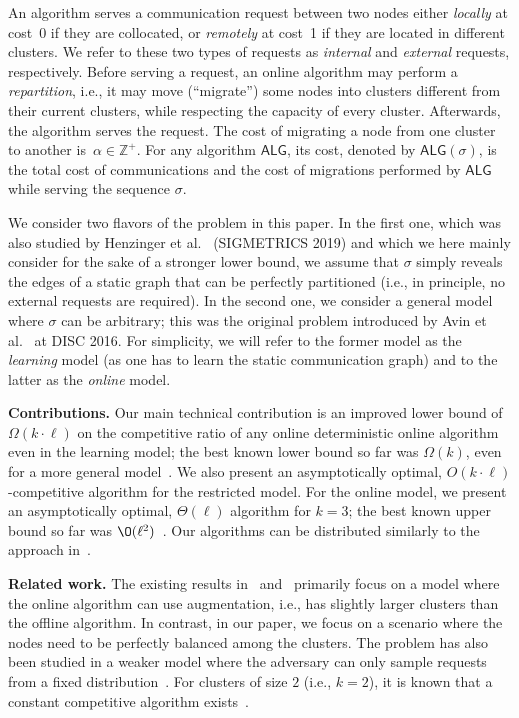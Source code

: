 \documentclass[manuscript,screen=true, review, anonymous]{acmart}
\newcommand{\ALG}{\textsf{ALG}\xspace}
\begin{document}
An algorithm serves a communication request between two nodes
either \emph{locally} at cost~0
if they are collocated,
or \emph{remotely} at cost~1
if they are located in different clusters.
We refer to these two types of requests as \emph{internal}
and \emph{external} requests, respectively.
Before serving a request,
an online algorithm may perform a \emph{repartition},
i.e.,
it may move (``migrate'') some nodes into clusters different from their current clusters, while respecting the capacity of every cluster. 
Afterwards, 
the algorithm serves the  request.
The cost of migrating a node from one cluster to another
is~$\alpha \in \mathbb{Z}^+$.
For any algorithm $\ALG$,
its cost,
denoted by $\ALG(\sigma)$,
is the total cost of communications and
the cost of migrations performed by $\ALG$ while serving the sequence $\sigma$.

We consider two flavors of the problem
in this paper. In the first one, which
was also studied by Henzinger et al.~\cite{sigmetrics19_partitioning}
(SIGMETRICS 2019) and which
we here mainly consider for the sake of a stronger
lower bound, we assume that $\sigma$
simply reveals the edges of a static graph
that can be perfectly partitioned
(i.e., in principle, no external requests
are required). 
In the second one, we consider a general
model where $\sigma$ can be arbitrary;
this was the original problem introduced
by Avin et al.~\cite{repartition-disc} at DISC 2016.
For simplicity, we will refer to the former
model as the \emph{learning} model (as
one has to learn the static communication graph) 
and to the latter as the \emph{online} model.


\noindent \textbf{Contributions.}
Our main technical contribution 
is an improved lower bound 
of $\Omega(k\cdot\ell)$ on the competitive ratio of any online deterministic online algorithm 
even in the learning model;
the best known lower bound so far was $\Omega(k)$,
even for a more general model~\cite{repartition-disc}.
We also present an asymptotically optimal, 
$O(k\cdot \ell)$-competitive algorithm
for the restricted model.
For the online model, we present  
an asymptotically optimal,
$\Theta(\ell)$ algorithm for $k=3$;
the best known upper bound 
so far was $\O(\ell^2)$~\cite{repartition-disc}.
%
Our algorithms can be distributed
similarly to the approach in~\cite{sigmetrics19_partitioning}.

\noindent \textbf{Related work.}
The existing results in~\cite{repartition-disc}
and~\cite{sigmetrics19_partitioning}
primarily focus on a model where 
the online algorithm can use augmentation,
i.e., has slightly larger clusters than the offline 
algorithm. In contrast, in our paper, we focus
on a scenario where the nodes need to be
perfectly balanced among the clusters.
The problem has also been studied in a weaker
model where the adversary can only sample
requests from a fixed distribution~\cite{stochastic-ring}.
For clusters of size $2$ (i.e., $k=2$), 
it is known that a constant competitive algorithm exists~\cite{repartition-disc}.
\end{document}
